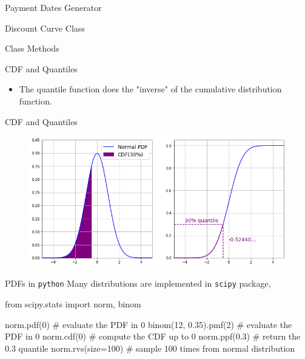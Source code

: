 \documentclass{beamer}
\begin{document}
\begin{frame}[fragile]{Payment Dates Generator}
\begin{itemize}
\begin{frame}{Discount Curve Class}
\begin{frame}{Class Methods}
\begin{itemize}
\begin{iptyhon}
\begin{frame}{CDF and Quantiles}
\begin{itemize}
    \item The quantile function does the "inverse" of the cumulative distribution function.
	\end{itemize}
\end{frame}

\begin{frame}{CDF and Quantiles}
    \begin{figure}[h]
    \begin{center}
    \includegraphics[width=0.7\linewidth]{cdf_quantiles}
    \end{center}
    \end{figure}    
\end{frame}

\begin{frame}[fragile]{PDFs in \texttt{python}}
    Many distributions are implemented in \texttt{scipy} package,
\begin{ipython}
from scipy.stats import norm, binom
     
norm.pdf(0)   				# evaluate the PDF in 0
binom(12, 0.35).pmf(2)		# evaluate the PDF in 0
norm.cdf(0)					# compute the CDF up to 0
norm.ppf(0.3)               # return the 0.3 quantile
norm.rvs(size=100)          # sample 100 times from normal distribution
\end{ipython}
\end{frame}


\end{iptyhon}
\end{itemize}
\end{frame}
\end{frame}
\end{itemize}
\end{frame}
\end{document}
